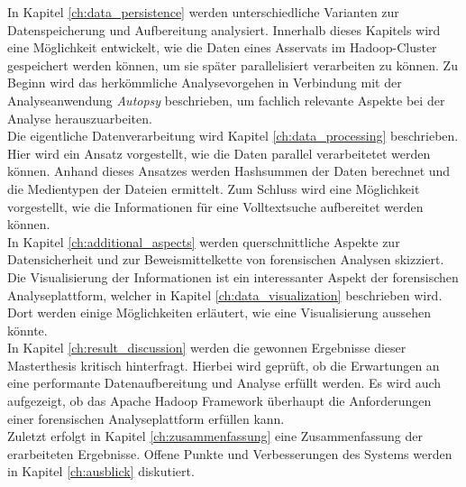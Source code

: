 \noindent
In Kapitel \ref{ch:data_persistence} werden unterschiedliche Varianten zur Datenspeicherung und Aufbereitung analysiert. Innerhalb dieses Kapitels wird eine Möglichkeit entwickelt, wie die Daten eines Asservats im Hadoop-Cluster gespeichert werden können, um sie später parallelisiert verarbeiten zu können. Zu Beginn wird das herkömmliche Analysevorgehen in Verbindung mit der Analyseanwendung \textit{Autopsy} beschrieben, um fachlich relevante Aspekte bei der Analyse herauszuarbeiten.\\

\noindent
Die eigentliche Datenverarbeitung wird Kapitel \ref{ch:data_processing} beschrieben. Hier wird ein Ansatz vorgestellt, wie die Daten parallel verarbeitetet werden können. Anhand dieses Ansatzes werden Hashsummen der Daten berechnet und die Medientypen der Dateien ermittelt. Zum Schluss wird eine Möglichkeit vorgestellt, wie die Informationen für eine Volltextsuche aufbereitet werden können.\\

\noindent
In Kapitel \ref{ch:additional_aspects} werden querschnittliche Aspekte zur Datensicherheit und zur Beweismittelkette von forensischen Analysen skizziert.\\

\noindent
Die Visualisierung der Informationen ist ein interessanter Aspekt der forensischen Analyseplattform, welcher in Kapitel \ref{ch:data_visualization} beschrieben wird. Dort werden einige Möglichkeiten erläutert, wie eine Visualisierung aussehen könnte.\\

\noindent
In Kapitel \ref{ch:result_discussion} werden die gewonnen Ergebnisse dieser Masterthesis kritisch hinterfragt. Hierbei wird geprüft, ob die Erwartungen an eine performante Datenaufbereitung und Analyse erfüllt werden. Es wird auch aufgezeigt, ob das Apache Hadoop Framework überhaupt die Anforderungen einer forensischen Analyseplattform erfüllen kann.\\   

\noindent
Zuletzt erfolgt in Kapitel \ref{ch:zusammenfassung} eine Zusammenfassung der erarbeiteten Ergebnisse. Offene Punkte und Verbesserungen des Systems werden in Kapitel \ref{ch:ausblick} diskutiert. 
